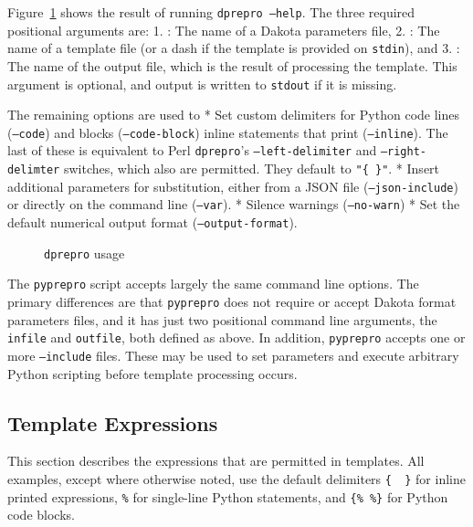 Figure~\ref{advint:dprepro_usage} shows the result of running
\texttt{dprepro --help}. The three required positional arguments are:
1. : The name of a Dakota parameters file,
2. : The name of a template file (or a dash if the template 
is provided on \texttt{stdin}), and 
3. : The name of the output file, which is the result of
processing the template. This argument is optional, and output is written
to \texttt{stdout} if it is missing.

The remaining options are used to
* Set custom delimiters for Python code lines (\texttt{--code}) and blocks 
(\texttt{--code-block}) inline statements that print (\texttt{--inline}).
The last of these is equivalent to Perl \texttt{dprepro}'s 
\texttt{--left-delimiter} and \texttt{--right-delimter} switches, which also
are permitted. They default to \texttt{"\{ \}"}.
* Insert additional parameters for substitution, either from a JSON file
(\texttt{--json-include}) or directly on the command line (\texttt{--var}).
* Silence warnings (\texttt{--no-warn})
* Set the default numerical output format (\texttt{--output-format}).

\begin{figure}
  \centering
  \begin{bigbox}
    \begin{small}
    \end{small}
  \end{bigbox}
  \caption{\texttt{dprepro} usage}
  \label{advint:dprepro_usage}
\end{figure}

The \texttt{pyprepro} script accepts largely the same command line options.
The primary differences are that \texttt{pyprepro} does not require or accept
Dakota format parameters files, and it has just two positional command line
arguments, the \texttt{infile} and \texttt{outfile}, both defined as above.
In addition, \texttt{pyprepro} accepts one or more \texttt{--include} files.
These may be used to set parameters and execute arbitrary Python scripting 
before template processing occurs.

\subsection{Template Expressions}\label{interfaces:template-expressions}

This section describes the expressions that are permitted in templates. All 
examples, except where otherwise noted, use the default delimiters \texttt{\{\ \ \}} 
for inline printed expressions, \texttt{\%} for single-line 
Python statements, and \texttt{\{\%\ \%\}} for Python code blocks.

